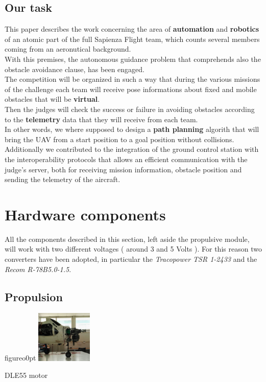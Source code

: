\documentclass[oneside,onecolumn]{article}
\begin{document}
\subsection{Our task}
This paper describes the work concerning the area of \textbf{automation} and
\textbf{robotics} of an atomic part of the full Sapienza Flight team, which
counts several members coming from an aeronutical background.\\
With this premises, the autonomous guidance problem that comprehends also the obstacle avoidance clause, has been engaged.\\
The competition will be organized in such a way that during the various missions
of the challenge each team will receive pose informations about fixed and mobile
obstacles that will be \textbf{virtual}.\\
Then the judges will check the success or failure in avoiding obstacles
according to the \textbf{telemetry} data that they will receive from each team.\\
In other words, we where supposed to design a \textbf{path planning} algorith
that will bring the UAV from a start position to a goal position without
collisions.\\
Additionally we contributed to the integration of the ground control station
with the interoperability protocols that allows an efficient communication with
the judge's server, both for receiving mission information, obstacle position
and sending the telemetry of the aircraft.


\section{Hardware components}
All the components described in this section, left aside the propulsive module,
will work with two different voltages ( around 3 and 5 Volts ). For this reason
two converters have been adopted, in particular the \textit{Tracopower TSR 1-2433
 } and the \textit{Recom R-78B5.0-1.5}.
\subsection{Propulsion}
\begin{wrapfloat}{figure}{o}{0pt}
  \includegraphics[width=0.2\textwidth]{YAK3}
  \caption{DLE55 motor}\label{wrap-fig:2}
\end{wrapfloat} 
\end{document}
